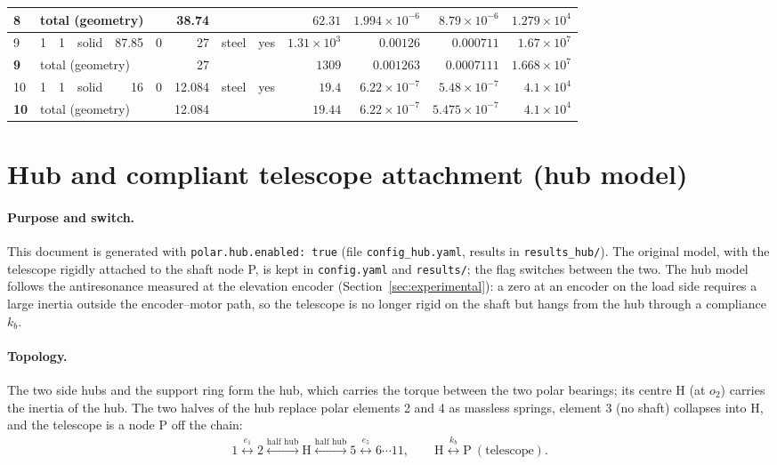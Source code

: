 \documentclass[10pt,a4paper]{article}
\numberwithin{equation}{section}
\begin{document}
\begin{longtable}{llllrrrlcrrrr}
\midrule \textbf{8} & \multicolumn{5}{l}{total (geometry)} & 38.74 & & & $62.31$ & $1.994\times10^{-6}$ & $8.79\times10^{-6}$ & $1.279\times10^{4}$ \\ \midrule
9 & 1 & 1 & solid & 87.85 & 0 & 27 & steel & yes & $1.31\times10^{3}$ & $0.00126$ & $0.000711$ & $1.67\times10^{7}$ \\
\midrule \textbf{9} & \multicolumn{5}{l}{total (geometry)} & 27 & & & $1309$ & $0.001263$ & $0.0007111$ & $1.668\times10^{7}$ \\ \midrule
10 & 1 & 1 & solid & 16 & 0 & 12.084 & steel & yes & $19.4$ & $6.22\times10^{-7}$ & $5.48\times10^{-7}$ & $4.1\times10^{4}$ \\
\midrule \textbf{10} & \multicolumn{5}{l}{total (geometry)} & 12.084 & & & $19.44$ & $6.22\times10^{-7}$ & $5.475\times10^{-7}$ & $4.1\times10^{4}$ \\ \midrule
\bottomrule\end{longtable}
\endgroup
\section{Hub and compliant telescope attachment (hub model)}\label{sec:hub}
\paragraph{Purpose and switch.} This document is generated with \texttt{polar.hub.enabled: true} (file \texttt{config\_hub.yaml}, results in \texttt{results\_hub/}). The original model, with the telescope rigidly attached to the shaft node P, is kept in \texttt{config.yaml} and \texttt{results/}; the flag switches between the two. The hub model follows the antiresonance measured at the elevation encoder (Section~\ref{sec:experimental}): a zero at an encoder on the load side requires a large inertia outside the encoder--motor path, so the telescope is no longer rigid on the shaft but hangs from the hub through a compliance $k_b$.
\paragraph{Topology.} The two side hubs and the support ring form the hub, which carries the torque between the two polar bearings; its centre H (at $o_2$) carries the inertia of the hub. The two halves of the hub replace polar elements 2 and 4 as massless springs, element 3 (no shaft) collapses into H, and the telescope is a node P off the chain:
\begin{gather}
1 \overset{e_1}{\longleftrightarrow} 2 \overset{\text{half hub}}{\longleftrightarrow} \mathrm H \overset{\text{half hub}}{\longleftrightarrow} 5 \overset{e_5}{\longleftrightarrow} 6 \cdots 11, \qquad \mathrm H \overset{k_b}{\longleftrightarrow} \mathrm P\ (\text{telescope}).
\end{gather}
\end{document}
